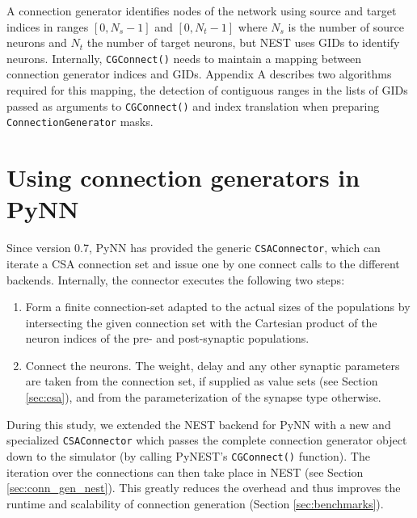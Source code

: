 \documentclass{frontiersSCNS} %
\begin{document}
A connection generator identifies nodes of the network using source
and target indices in ranges $[0, N_s-1]$ and $[0, N_t-1]$ where $N_s$
is the number of source neurons and $N_t$ the number of target
neurons, but NEST uses GIDs to identify neurons.  Internally,
\verb|CGConnect()| needs to maintain a mapping between connection
generator indices and GIDs.  Appendix A describes two algorithms
required for this mapping, the detection of contiguous ranges in the
lists of GIDs passed as arguments to \verb|CGConnect()| and index
translation when preparing \verb|ConnectionGenerator| masks.


\section{Using connection generators in PyNN}\label{sec:conn_gen_pynn}

Since version 0.7, PyNN has provided the generic \verb|CSAConnector|, which can
iterate a CSA connection set and issue one by one connect calls to
the different backends. Internally, the connector executes the
following two steps:

\begin{enumerate}
\item Form a finite connection-set adapted to the actual sizes of the
  populations by intersecting the given connection set with the
  Cartesian product of the neuron indices of the pre- and
  post-synaptic populations.
\item Connect the neurons. The weight, delay and any other synaptic
  parameters are taken from the connection set, if supplied as value
  sets (see Section \ref{sec:csa}), and from the parameterization of
  the synapse type otherwise.
\end{enumerate}

During this study, we extended the NEST backend for PyNN with a new
and specialized \verb|CSAConnector| which passes the complete
connection generator object down to the simulator (by calling PyNEST's
\verb|CGConnect()| function). The iteration over the connections can
then take place in NEST (see Section \ref{sec:conn_gen_nest}). This
greatly reduces the overhead and thus improves the runtime and
scalability of connection generation (Section \ref{sec:benchmarks}).

\end{document}
